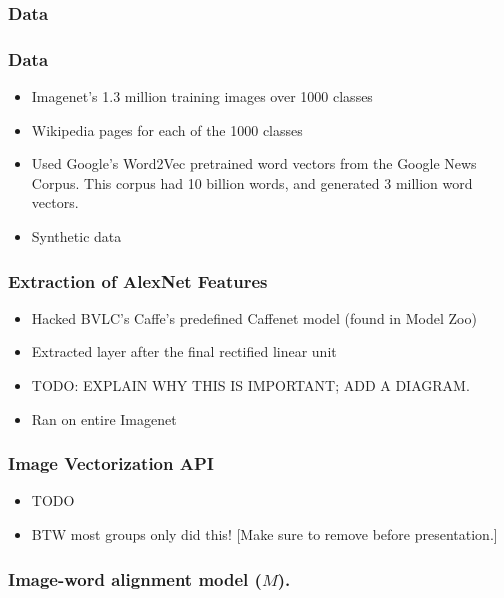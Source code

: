 \documentclass{beamer}
\begin{document}
\begin{frame}
  \frametitle{Data}
\end{frame}

\begin{frame}
  \frametitle{Data}
  \begin{itemize}
  \item Imagenet's 1.3 million training images over 1000 classes
  \item Wikipedia pages for each of the 1000 classes
  \item Used Google's Word2Vec pretrained word vectors from the Google News Corpus.
	This corpus had 10 billion words, and generated 3 million word vectors.
  \item Synthetic data
  \end{itemize}
\end{frame}

\begin{frame}
  \frametitle{Extraction of AlexNet Features}
  \begin{itemize}
    \item Hacked BVLC's Caffe's predefined Caffenet model (found in Model Zoo)
    \item Extracted layer after the final rectified linear unit
    \item TODO: EXPLAIN WHY THIS IS IMPORTANT; ADD A DIAGRAM.
    \item Ran on entire Imagenet
  \end{itemize}
\end{frame}

\begin{frame}
  \frametitle{Image Vectorization API}
  \begin{itemize}
    \item TODO
    \item BTW most groups only did this! [Make sure to remove before presentation.]
  \end{itemize}
\end{frame}

\begin{frame}
  \frametitle{Image-word alignment model ($M$).}
\end{frame}
\end{document}
